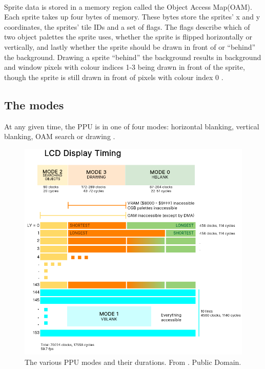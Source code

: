 \\
Sprite data is stored in a memory region called the Object Access Map(OAM). Each sprite takes up four bytes of memory. These bytes store the sprites' x and y coordinates, the sprites' tile IDs and a set of flags. The flags describe which of two object palettes the sprite uses, whether the sprite is flipped horizontally or vertically, and lastly whether the sprite should be drawn in front of or ``behind'' the background. Drawing a sprite ``behind'' the background results in background and window pixels with colour indices 1-3 being drawn in front of the sprite, though the sprite is still drawn in front of pixels with colour index 0 \cite{pandocsVideo}.

\subsection{The modes}
\label{sec:PPU_Modes}
At any given time, the PPU is in one of four modes: horizontal blanking, vertical blanking, OAM search or drawing \cite{pandocsVideo}.

\begin{figure}[H]
    \centering
    \includegraphics[scale=0.5]{figures/PPU/Mode_diagram.png}
    \caption{The various PPU modes and their durations. From \cite{pandocs}. Public Domain.}
    \label{fig:PPU_timing}
\end{figure}


